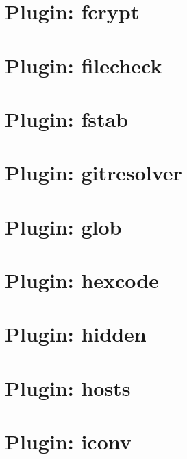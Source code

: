 \documentclass[twoside]{book}
\newcommand{\+}{\discretionary{\mbox{\scriptsize$\hookleftarrow$}}{}{}}
\begin{document}
\chapter{Plugin\+: fcrypt}
\label{md_src_plugins_fcrypt_README}
\hypertarget{md_src_plugins_fcrypt_README}{}

\chapter{Plugin\+: filecheck}
\label{md_src_plugins_filecheck_README}
\hypertarget{md_src_plugins_filecheck_README}{}

\chapter{Plugin\+: fstab}
\label{md_src_plugins_fstab_README}
\hypertarget{md_src_plugins_fstab_README}{}

\chapter{Plugin\+: gitresolver}
\label{md_src_plugins_gitresolver_README}
\hypertarget{md_src_plugins_gitresolver_README}{}

\chapter{Plugin\+: glob}
\label{md_src_plugins_glob_README}
\hypertarget{md_src_plugins_glob_README}{}

\chapter{Plugin\+: hexcode}
\label{md_src_plugins_hexcode_README}
\hypertarget{md_src_plugins_hexcode_README}{}

\chapter{Plugin\+: hidden}
\label{md_src_plugins_hidden_README}
\hypertarget{md_src_plugins_hidden_README}{}

\chapter{Plugin\+: hosts}
\label{md_src_plugins_hosts_README}
\hypertarget{md_src_plugins_hosts_README}{}

\chapter{Plugin\+: iconv}
\label{md_src_plugins_iconv_README}
\hypertarget{md_src_plugins_iconv_README}{}

\end{document}
